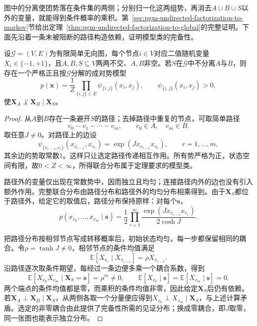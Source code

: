 图中的分离使团势落在条件集的两侧；分别归一化这两组势，再消去$A\cup B\cup S$以外的变量，就能得到条件概率的乘积。第~\ref{sec:pgm-undirected-factorization-to-markov}节给出定理~\ref{thm:pgm-undirected-factorization-to-global}的完整证明。下面先沿着一条未被阻断的路径构造依赖，证明模型类的完备性。

\begin{theorem}[严格正二值成对势模型类中的分离完备性]
  \label{thm:pgm-undirected-separation-completeness}
  设$\mathcal{G}=(V,E)$为有限简单无向图，每个节点$i\in V$对应二值随机变量$X_i\in\{-1,+1\}$，且$A,B,S\subseteq V$两两不交、$A,B$非空。若$S$在$\mathcal{G}$中不分离$A$与$B$，则存在一个严格正且按$\mathcal{G}$分解的成对势模型
  \[
    p(\bm{x})=\frac{1}{Z}
      \prod_{\{i,j\}\in E}\psi_{\{i,j\}}(x_i,x_j),
    \qquad \psi_{\{i,j\}}(x_i,x_j)>0,
  \]
  使$\bm{X}_A\not\perp\bm{X}_B\mid\bm{X}_S$。
\end{theorem}

\begin{proof}
从$A$到$B$存在一条避开$S$的路径；去掉路径中重复的节点，可取简单路径
\[
  v_0-v_1-\cdots-v_m,
  \qquad v_0\in A,\quad v_m\in B.
\]
取任意$J\neq0$。对路径上的边设
\[
  \psi_{\{v_{r-1},v_r\}}(x_{v_{r-1}},x_{v_r})
  =\exp(Jx_{v_{r-1}}x_{v_r}),
  \qquad r=1,\ldots,m,
\]
其余边的势取常数$1$。这样只让选定路径传递相互作用。所有势严格为正，状态空间有限，故$0<Z<\infty$，所得联合分布属于定理要求的模型类。

路径外的变量仅出现在常数势中，因而独立且均匀；连接路径内外的边也没有引入额外作用。完整联合分布由路径分布和路径外的均匀分布相乘得到。由于$\bm{X}_S$都位于路径外，给定它的取值后，路径分布保持原样：对每个$\bm{s}$，
\[
  p(x_{v_0},\ldots,x_{v_m}\mid\bm{s})
  =\frac12\prod_{r=1}^{m}
    \frac{\exp(Jx_{v_{r-1}}x_{v_r})}{2\cosh J}.
\]

把路径分布按相邻节点写成转移概率后，初始状态均匀，每一步都保留相同的耦合。令$\rho=\tanh J\neq0$，相邻节点的条件均值满足
\[
  \mathbb{E}[X_{v_r}\mid X_{v_{r-1}}]
  =\rho X_{v_{r-1}}.
\]
沿路径逐次取条件期望，每经过一条边便多乘一个耦合系数，得到
\[
  \mathbb{E}[X_{v_0}X_{v_m}\mid\bm{X}_S=\bm{s}]
  =\rho^m\neq0,
  \qquad
  \mathbb{E}[X_{v_0}\mid\bm{s}]
  =\mathbb{E}[X_{v_m}\mid\bm{s}]=0.
\]
两个端点的条件均值都是零，而乘积的条件均值非零，因此给定$\bm{X}_S$后仍有依赖。若$\bm{X}_A\perp\bm{X}_B\mid\bm{X}_S$，从两侧各取一个分量便应得到$X_{v_0}\perp X_{v_m}\mid\bm{X}_S$，与上述计算矛盾。选定的非零耦合由此提供了完备性所需的见证分布；换成零耦合，即$J$取零，同一张图也能表示独立分布。
\end{proof}

